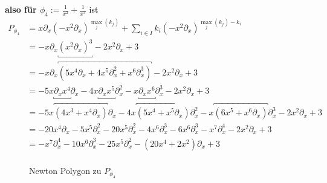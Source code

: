 \textbf{also für
$\phi_4:=\frac{1}{x^2}+\frac{1}{x^3}$} ist
\begin{align*}
P_{\phi_4} &=x\partial_x(-x^2\partial_x)^{\max_j(k_j)}
             +\sum_{i\in I} k_i(-x^2\partial_x)^{\max_j(k_j)-k_i}\\
           &=-x\partial_x\underbracket{(x^2\partial_x)^{3}}
             -2x^2\partial_x +3\\
           &=-x\partial_x\overbracket{(5x^4\partial_x+4x^{5}\partial_x^2
             +x^6\partial_x^3)}-2x^2\partial_x +3\\
           &=-5x\underbracket{\partial_xx^4}\partial_x
             -4x\underbracket{\partial_xx^{5}}\partial_x^2
             -x\underbracket{\partial_xx^6}\partial_x^3
             -2x^2\partial_x +3\\
           &=-5x\overbracket{(4x^3+x^4\partial_x)}\partial_x
             -4x\overbracket{(5x^4+x^{5}\partial_x)}\partial_x^2
             -x\overbracket{(6x^5+x^6\partial_x)}\partial_x^3
             -2x^2\partial_x+3\\
           &=-20x^4\partial_x-5x^5\partial_x^2
             -20x^5\partial_x^2-4x^{6}\partial_x^3
             -6x^6\partial_x^3-x^7\partial_x^4
             -2x^2\partial_x +3\\
           &=-x^7\partial_x^4-10x^6\partial_x^3-25x^5\partial_x^2
             -(20x^4+2x^2)\partial_x+3\\
\end{align*}
\begin{figure}[H]
\caption{Newton Polygon zu $P_{\phi_4}$}
\begin{center}
\end{center}
\end{figure}

